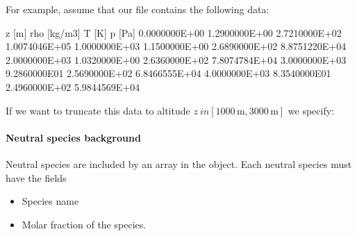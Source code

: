 \documentclass[letterpaper,10pt,english]{sphinxmanual}
\begin{document}
\sphinxAtStartPar
For example, assume that our file  contains the following data:

\begin{sphinxVerbatim}[commandchars=\\\{\},formatcom=\scriptsize]
\PYGZsh{} z [m]              rho [kg/m\PYGZca{}3]    T [K]           p [Pa]
0.0000000E+00        1.2900000E+00   2.7210000E+02   1.0074046E+05
1.0000000E+03        1.1500000E+00   2.6890000E+02   8.8751220E+04
2.0000000E+03        1.0320000E+00   2.6360000E+02   7.8074784E+04
3.0000000E+03        9.2860000E\PYGZhy{}01   2.5690000E+02   6.8466555E+04
4.0000000E+03        8.3540000E\PYGZhy{}01   2.4960000E+02   5.9844569E+04
\end{sphinxVerbatim}

\sphinxAtStartPar
If we want to truncate this data to altitude \(z \ in[1000\,\textrm{m}, 3000\,\textrm{m}]\) we specify:

\begin{sphinxVerbatim}[commandchars=\\\{\},formatcom=\scriptsize]
     
     
     
     
     
     
     
     
     
     
\end{sphinxVerbatim}


\paragraph{Neutral species background}
\label{\detokenize{Applications/CdrPlasmaModel:neutral-species-background}}
\sphinxAtStartPar
Neutral species are included by an array  in the  object.
Each neutral species must have the fields
\begin{itemize}
\item {} 
\sphinxAtStartPar
{} Species name

\item {} 
\sphinxAtStartPar
{} Molar fraction of the species.

\end{itemize}
\end{document}
